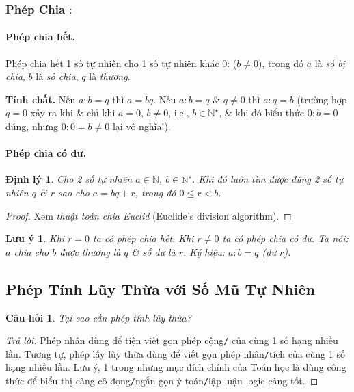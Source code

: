 \documentclass{article}
\numberwithin{equation}{section}
\newtheorem{theorem}{Định lý}[section]
\newtheorem{remark}{Lưu ý}[section]
\newtheorem{question}{Câu hỏi}[section]
\begin{document}
\subsubsection{Phép Chia $:$}

\paragraph{Phép chia hết.} Phép chia hết 1 số tự nhiên cho 1 số tự nhiên khác 0:  ($b\ne 0$), trong đó $a$ là \textit{số bị chia}, $b$ là \textit{số chia}, $q$ là \textit{thương}.

\noindent\textbf{Tính chất.} Nếu $a:b = q$ thì $a = bq$. Nếu $a:b = q$ \& $q\ne 0$ thì $a:q = b$ (trường hợp $q = 0$ xảy ra khi \& chỉ khi $a = 0$, $b\ne 0$, i.e., $b\in\mathbb{N}^\star$, \& khi đó biểu thức $0:b = 0$ đúng, nhưng $0:0 = b\ne 0$ lại vô nghĩa!).

\paragraph{Phép chia có dư.}
\begin{theorem}
	Cho 2 số tự nhiên $a\in\mathbb{N}$, $b\in\mathbb{N}^\star$. Khi đó luôn tìm được đúng 2 số tự nhiên $q$ \& $r$ sao cho $a = bq + r$, trong đó $0\le r < b$.
\end{theorem}

\begin{proof}[Proof]
	Xem \textit{thuật toán chia Euclid} (Euclide's division algorithm).
\end{proof}

\begin{remark}
	Khi $r = 0$ ta có phép chia hết. Khi $r\ne 0$ ta có phép chia có dư. Ta nói: $a$ chia cho $b$ được thương là $q$ \& số dư là $r$. Ký hiệu: $a:b = q$ (dư $r$).
\end{remark}

\subsection{Phép Tính Lũy Thừa với Số Mũ Tự Nhiên}

\begin{question}
	Tại sao cần phép tính lũy thừa?
\end{question}

\begin{proof}[Trả lời]
	Phép nhân dùng để tiện viết gọn phép cộng\texttt{/} của cùng 1 số hạng nhiều lần. Tương tự, phép lấy lũy thừa dùng để viết gọn phép nhân\texttt{/}tích của cùng 1 số hạng nhiều lần. Lưu ý, 1 trong những mục đích chính của Toán học là dùng công thức để biểu thị càng cô đọng\texttt{/}ngắn gọn ý toán\texttt{/}lập luận logic càng tốt.
\end{proof}
\end{document}
